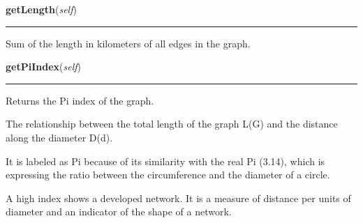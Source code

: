     \label{Epigrass:simobj:graph:getLength}

    \vspace{0.5ex}

    \begin{boxedminipage}{\textwidth}

    \raggedright \textbf{getLength}(\textit{self})

    \vspace{-1.5ex}

    \rule{\textwidth}{0.5\fboxrule}
    Sum of the length in kilometers of all edges in the graph.

    \vspace{1ex}

    \end{boxedminipage}

    \label{Epigrass:simobj:graph:getPiIndex}

    \vspace{0.5ex}

    \begin{boxedminipage}{\textwidth}

    \raggedright \textbf{getPiIndex}(\textit{self})

    \vspace{-1.5ex}

    \rule{\textwidth}{0.5\fboxrule}
    Returns the Pi index of the graph.

    The relationship between the total length of the graph L(G) and the 
    distance along the diameter D(d).

    It is labeled as Pi because of its similarity with the real Pi (3.14), 
    which is expressing the ratio between the circumference and the 
    diameter of a circle.

    A high index shows a developed network. It is a measure of distance per
    units of diameter and an indicator of the  shape of a network.

    \vspace{1ex}

    \end{boxedminipage}

    \label{Epigrass:simobj:graph:getBetaIndex}

